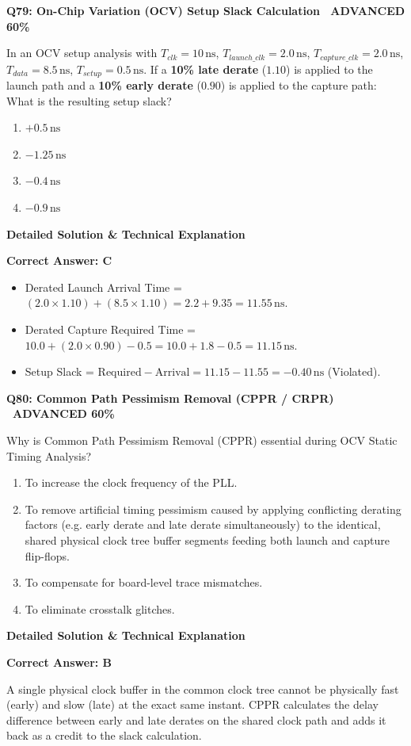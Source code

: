 \documentclass[11pt,a4paper]{article}
\newcommand{\badgeadv}{{\color{white}\colorbox{advred}{\bfseries\sffamily\tiny\ ADVANCED 60\%\ }}}
\newenvironment{qbox}[2]{%
  \begin{mdframed}[style=qstyle]%
  {\bfseries\sffamily\color{primaryblue}#1 \hfill #2}\par\vspace{2pt}%
}{%
  \end{mdframed}%
}
\newenvironment{ansbox}{%
  \begin{mdframed}[style=ansstyle]%
  {\bfseries\sffamily\color{ansgreen}\small Detailed Solution \& Technical Explanation}\par\vspace{2pt}\small%
}{%
  \end{mdframed}%
}
\begin{document}
\begin{qbox}{Q79: On-Chip Variation (OCV) Setup Slack Calculation}{\badgeadv}
In an OCV setup analysis with $T_{clk} = 10\,\text{ns}$, $T_{launch\_clk} = 2.0\,\text{ns}$, $T_{capture\_clk} = 2.0\,\text{ns}$, $T_{data} = 8.5\,\text{ns}$, $T_{setup} = 0.5\,\text{ns}$.  
If a \textbf{10\% late derate} ($1.10$) is applied to the launch path and a \textbf{10\% early derate} ($0.90$) is applied to the capture path:
What is the resulting setup slack?
\begin{enumerate}[label=\textbf{\Alph*.}]
  \item $+0.5\,\text{ns}$
  \item $-1.25\,\text{ns}$
  \item $-0.4\,\text{ns}$
  \item $-0.9\,\text{ns}$
\end{enumerate}
\end{qbox}
\begin{ansbox}
\textbf{Correct Answer: C}

\begin{itemize}[leftmargin=1.5em]
  \item Derated Launch Arrival Time = $(2.0 \times 1.10) + (8.5 \times 1.10) = 2.2 + 9.35 = 11.55\,\text{ns}$.
  \item Derated Capture Required Time = $10.0 + (2.0 \times 0.90) - 0.5 = 10.0 + 1.8 - 0.5 = 11.15\,\text{ns}$.
  \item Setup Slack = $\text{Required} - \text{Arrival} = 11.15 - 11.55 = -0.40\,\text{ns}$ (Violated).
\end{itemize}
\end{ansbox}

\begin{qbox}{Q80: Common Path Pessimism Removal (CPPR / CRPR)}{\badgeadv}
Why is Common Path Pessimism Removal (CPPR) essential during OCV Static Timing Analysis?
\begin{enumerate}[label=\textbf{\Alph*.}]
  \item To increase the clock frequency of the PLL.
  \item To remove artificial timing pessimism caused by applying conflicting derating factors (e.g. early derate and late derate simultaneously) to the identical, shared physical clock tree buffer segments feeding both launch and capture flip-flops.
  \item To compensate for board-level trace mismatches.
  \item To eliminate crosstalk glitches.
\end{enumerate}
\end{qbox}
\begin{ansbox}
\textbf{Correct Answer: B}

A single physical clock buffer in the common clock tree cannot be physically fast (early) and slow (late) at the exact same instant. CPPR calculates the delay difference between early and late derates on the shared clock path and adds it back as a credit to the slack calculation.
\end{ansbox}
\end{document}
